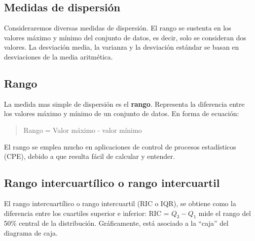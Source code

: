 \documentclass[]{article}
\begin{document}
\subsection{Medidas de dispersión}
Consideraremos diversas medidas de dispersión. El rango se sustenta en los valores máximo y mínimo del conjunto de datos, es decir, solo se consideran dos valores. La desviación media, la varianza y la desviación estándar se basan en desviaciones de la media aritmética.

\subsection*{Rango}
La medida mas simple de dispersión es el \textbf{rango}. Representa la diferencia entre los valores máximo y mínimo de un conjunto de datos. En forma de ecuación:
\begin{quote}
	Rango = Valor máximo - valor mínimo
\end{quote}
El rango se emplea mucho en aplicaciones de control de procesos estadísticos (CPE), debido a que resulta fácil de calcular y entender.
\subsection{Rango intercuartílico o rango intercuartil}
El rango intercuartílico o rango intercuartil (RIC o IQR), se obtiene como la diferencia entre los cuartiles superior e inferior: RIC = \textbf{$Q_{3} - Q_{1}$} mide el rango del 50\% central de la distribución. Gráficamente, está asociado a la “caja” del diagrama de caja.
\end{document}
